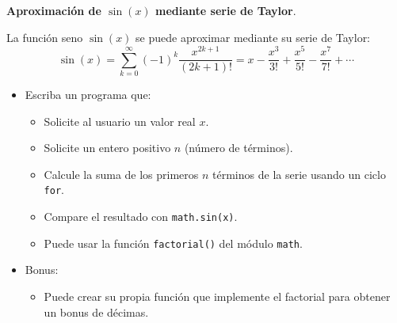 \item \textbf{Aproximación de \(\sin(x)\) mediante serie de Taylor}.

\begin{tcolorbox}[colback=blue!2!white,colframe=blue!55!black,title={Enunciado}]
La función seno \(\sin(x)\) se puede aproximar mediante su serie de Taylor:
\[
\sin(x) = \sum_{k=0}^{\infty} (-1)^k \frac{x^{2k+1}}{(2k+1)!} = x - \frac{x^3}{3!} + \frac{x^5}{5!} - \frac{x^7}{7!} + \cdots
\]

\begin{itemize}
    \item Escriba un programa que:
    \begin{itemize}
        \item Solicite al usuario un valor real \(x\).
        \item Solicite un entero positivo \(n\) (número de términos).
        \item Calcule la suma de los primeros \(n\) términos de la serie usando un ciclo \texttt{for}.
\item Compare el resultado con \texttt{math.sin(x)}.
\item Puede usar la función \texttt{factorial()} del módulo \texttt{math}.
    \end{itemize}
    
     \item Bonus: 
     \begin{itemize}
	\item Puede crear su propia función que implemente el factorial para obtener un bonus de décimas.
     \end{itemize}
\end{itemize}
\end{tcolorbox}

